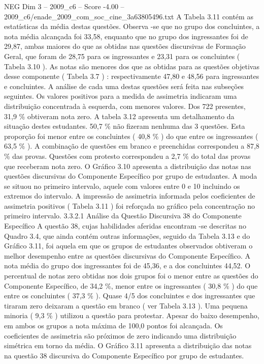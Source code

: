 \begin{textsample}{NEG Dim 3 – 2009\_c6 – Score -4.00 – 2009\_c6/enade\_2009\_com\_soc\_cine\_3a63805496.txt}
A Tabela 3.11 contém as estatísticas da média destas questões.
Observa -se que no grupo dos concluintes, a nota média alcançada foi 33,58, enquanto que no grupo dos ingressantes foi de 29,87, ambas maiores do que as obtidas nas questões discursivas de Formação Geral, que foram de 28,75 para os ingressantes e 23,31 para os concluintes ( Tabela 3.10 ).
As notas são menores dos que as obtidas para as questões objetivas desse componente ( Tabela 3.7 ) : respectivamente 47,80 e 48,56 para ingressantes e concluintes.
A análise de cada uma destas questões será feita nas subseções seguintes.
Os valores positivos para a medida de assimetria indicaram uma distribuição concentrada à esquerda, com menores valores.
Dos 722 presentes, 31,9 \% obtiveram nota zero.
A tabela 3.12 apresenta um detalhamento da situação destes estudantes. 50,7 \% não fizeram nenhuma das 3 questões.
Esta proporção foi menor entre os concluintes ( 40,8 \% ) do que entre os ingressantes ( 63,5 \% ).
A combinação de questões em branco e preenchidas correspondeu a 87,8 \% das provas.
Questões com protesto correspondeu a 2,7 \% do total das provas que receberam nota zero.
O Gráfico 3.10 apresenta a distribuição das notas nas questões discursivas do Componente Específico por grupo de estudantes.
A moda se situou no primeiro intervalo, aquele com valores entre 0 e 10 incluindo os extremos do intervalo.
A impressão de assimetria informada pelos coeficientes de assimetria positivos ( Tabela 3.11 ) foi reforçada no gráfico pela concentração no primeiro intervalo. 3.3.2.1 Análise da Questão Discursiva 38 do Componente Específico A questão 38, cujas habilidades aferidas encontram -se descritas no Quadro 3.4, que ainda contém outras informações, seguido da Tabela 3.13 e do Gráfico 3.11, foi aquela em que os grupos de estudantes observados obtiveram o melhor desempenho entre as questões discursivas do Componente Específico.
A nota média do grupo dos ingressantes foi de 45,36, e a dos concluintes 44,52.
O percentual de notas zero obtidas nos dois grupos foi o menor entre as questões do Componente Específico, de 34,2 \%, menor entre os ingressantes ( 30,8 \% ) do que entre os concluintes ( 37,3 \% ).
Quase 4/5 dos concluintes e dos ingressantes que tiraram zero deixaram a questão em branco ( ver Tabela 3.13 ).
Uma pequena minoria ( 9,3 \% ) utilizou a questão para protestar.
Apesar do baixo desempenho, em ambos os grupos a nota máxima de 100,0 pontos foi alcançada.
Os coeficientes de assimetria são próximos de zero indicando uma distribuição simétrica em torno da média.
O Gráfico 3.11 apresenta a distribuição das notas na questão 38 discursiva do Componente Específico por grupo de estudantes.

\end{textsample}
